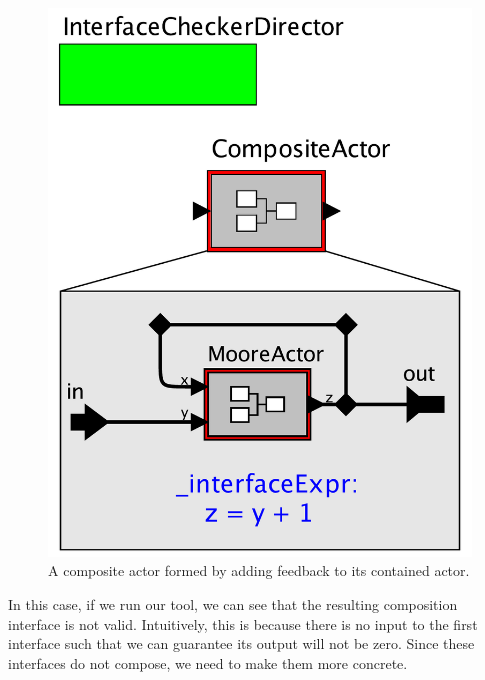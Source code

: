 \documentclass[preprint,11pt,authoryear]{sigplanconf}
\begin{document}
\begin{figure}[htbp]
\centering
\includegraphics[width=\columnwidth]{figs/feedbackComp} 
\caption{A composite actor formed by adding feedback to its contained actor.}
\label{fig:feedbackComp}
\end{figure}

In this case, if we run our tool, we can see that the resulting composition interface is not valid.  Intuitively, this is because there is no input to the first interface such that we can guarantee its output will not be zero.  Since these interfaces do not compose, we need to make them more concrete.
\end{document}
